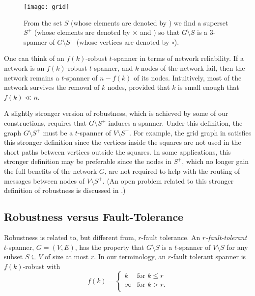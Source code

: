 \documentclass{patmorin}
\begin{document}
\begin{figure}
  \begin{center}
    \texttt{[image: grid]}
  \end{center}
  \caption{From the set $S$ (whose elements are denoted by \textbullet)
  we find a superset $S^+$ (whose elements are denoted by $\times$ and
  \textbullet) so that $G\setminus S$ is a 3-spanner of $G\setminus S^+$
  (whose vertices are denoted by $\circ$).}
\end{figure}

One can think of an $f(k)$-robust $t$-spanner in terms of network
reliability.  If a network is an $f(k)$-robust $t$-spanner, and $k$ nodes
of the network fail, then the network remains a $t$-spanner of $n-f(k)$
of its nodes.  Intuitively, most of the network survives the removal of
$k$ nodes, provided that $k$ is small enough that $f(k)\ll n$.

A slightly stronger version of robustness, which is achieved by some
of our constructions, requires that $G\setminus S^+$ induces a spanner.
Under this definition, the graph $G\setminus S^+$ must be a $t$-spanner of
$V\setminus S^+$. For example, the grid graph in  satisfies
this stronger definition since the vertices inside the squares are not
used in the short paths between vertices outside the squares.  In some
applications, this stronger definition may be preferable since the nodes
in $S^+$, which no longer gain the full benefits of the network $G$,
are not required to help with the routing of messages between nodes of
$V\setminus S^+$.  (An open problem related to this stronger definition
of robustness is discussed in .)

\subsection{Robustness versus Fault-Tolerance}

Robustness is related to, but different from, $r$-fault tolerance.
An \emph{$r$-fault-tolerant} $t$-spanner, $G=(V,E)$, has the property
that $G\setminus S$ is a $t$-spanner of $V\setminus S$ for any subset
$S\subseteq V$ of size at most $r$.  In our terminology, an $r$-fault
tolerant spanner is $f(k)$-robust with
\[
    f(k) = \begin{cases}k & \text{for $k \le r$}  \\
                   \infty & \text{for $k > r$.}  \\
   \end{cases}
\]
\end{document}
